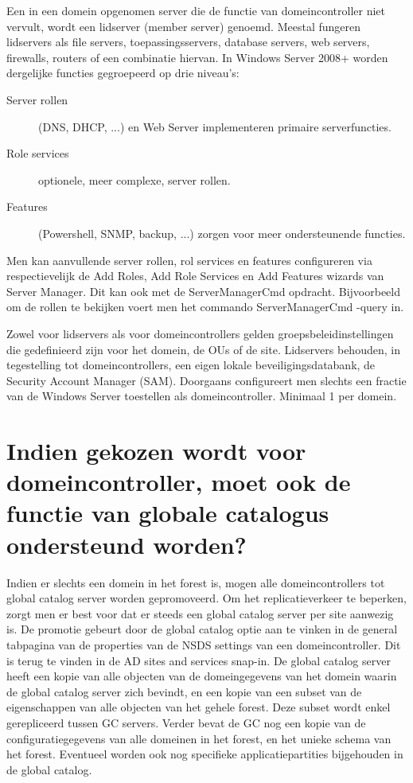 Een in een domein opgenomen server die de functie van domeincontroller niet
vervult, wordt een lidserver (member server) genoemd. Meestal fungeren
lidservers als file servers, toepassingsservers, database servers, web servers,
firewalls, routers of een combinatie hiervan. In Windows Server 2008+ worden
dergelijke functies gegroepeerd op drie niveau's:
\begin{description}
	\item[Server rollen] (DNS, DHCP, ...) en Web Server implementeren
		primaire serverfuncties.
	\item[Role services] optionele, meer complexe, server rollen.
	\item[Features] (Powershell, SNMP, backup, ...) zorgen voor meer
		ondersteunende functies.
\end{description}
Men kan aanvullende server rollen, rol services en features configureren via
respectievelijk de Add Roles, Add Role Services en Add Features wizards van
Server Manager. Dit kan ook met de ServerManagerCmd opdracht. Bijvoorbeeld om 
de rollen te bekijken voert men het commando ServerManagerCmd -query in.

Zowel voor lidservers als voor domeincontrollers gelden groepsbeleidinstellingen
die gedefinieerd zijn voor het domein, de OUs of de site. Lidservers behouden, in
tegestelling tot domeincontrollers, een eigen lokale beveiligingsdatabank, de
Security Account Manager (SAM).
Doorgaans configureert men slechts een fractie van de Windows Server toestellen
als domeincontroller. Minimaal 1 per domein.

\section{Indien gekozen wordt voor domeincontroller, moet ook de functie van
globale catalogus ondersteund worden?}

Indien er slechts een domein in het forest is, mogen alle domeincontrollers tot
global catalog server worden gepromoveerd. Om het replicatieverkeer te beperken,
zorgt men er best voor dat er steeds een global catalog server per site aanwezig
is. De promotie gebeurt door de global catalog optie aan te vinken in de general
tabpagina van de properties van de NSDS settings van een domeincontroller. Dit
is terug te vinden in de AD sites and services snap-in. De global catalog server
heeft een kopie van alle objecten van de domeingegevens van het domein waarin de
global catalog server zich bevindt, en een kopie van een subset van de
eigenschappen van alle objecten van het gehele forest. Deze subset wordt enkel
gerepliceerd tussen GC servers. Verder bevat de GC nog een kopie van de
configuratiegegevens van alle domeinen in het forest, en het unieke schema van
het forest. Eventueel worden ook nog specifieke applicatiepartities bijgehouden
in de global catalog.

